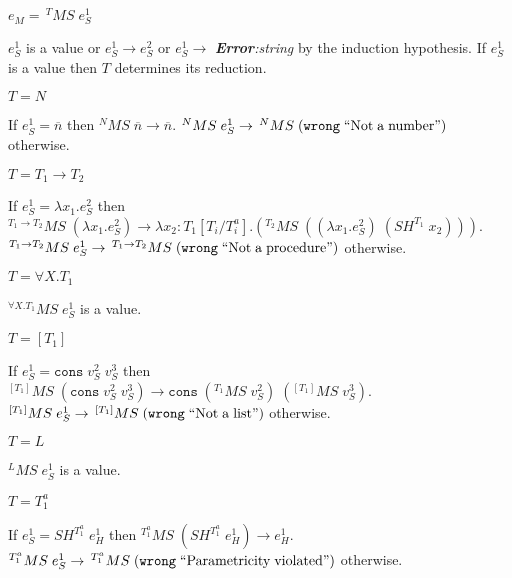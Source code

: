 \begin{case}
$e_{M}=\,^{T}MS\;e_{S}^{1}$

$e_{S}^{1}$ is a value or $e_{S}^{1}\rightarrow e_{S}^{2}$ or $e_{S}^{1}\rightarrow$ \emph{\textbf{Error}:\;string} by the induction hypothesis.  If $e_{S}^{1}$ is a value then $T$ determines its reduction.
\begin{subcase}
$T=N$

If $e_{S}^{1}=\overline{n}$ then $^{N}MS\;\overline{n}\rightarrow\overline{n}$.  $^{N}MS\;e_{S}^{1}\rightarrow\,^{N}MS\;(\mathtt{wrong}\;\mathrm{``Not\;a\;number"})$ otherwise.
\end{subcase}
\begin{subcase}
$T=T_{1}\rightarrow T_{2}$

If $e_{S}^{1}=\lambda x_{1}.e_{S}^{2}$ then $^{T_{1}\rightarrow T_{2}}MS\;(\lambda x_{1}.e_{S}^{2})\rightarrow\lambda x_{2}:T_{1}[T_{i}/T^{a}_{i}].(^{T_{2}}MS\;((\lambda x_{1}.e_{S}^{2})\;(SH^{T_{1}}\;x_{2})))$.  $^{T_{1}\rightarrow T_{2}}MS\;e_{S}^{1}\rightarrow\,^{T_{1}\rightarrow T_{2}}MS\;(\mathtt{wrong}\;\mathrm{``Not\;a\;procedure"})$ otherwise.
\end{subcase}
\begin{subcase}
$T=\forall X.T_{1}$

$^{\forall X.T_{1}}MS\;e_{S}^{1}$ is a value.
\end{subcase}
\begin{subcase}
$T=[T_{1}]$

If $e_{S}^{1}=\mathtt{cons}\;v_{S}^{2}\;v_{S}^{3}$ then $^{[T_{1}]}MS\;(\mathtt{cons}\;v_{S}^{2}\;v_{S}^{3})\rightarrow\mathtt{cons}\;(^{T_{1}}MS\;v_{S}^{2})\;(^{[T_{1}]}MS\;v_{S}^{3})$.  $^{[T_{1}]}MS\;e_{S}^{1}\rightarrow\,^{[T_{1}]}MS\;(\mathtt{wrong}\;\mathrm{``Not\;a\;list"})$ otherwise.
\end{subcase}
\begin{subcase}
$T=L$

$^{L}MS\;e_{S}^{1}$ is a value.
\end{subcase}
\begin{subcase}
$T=T_{1}^{a}$

If $e_{S}^{1}=SH^{T_{1}^{a}}\;e_{H}^{1}$ then $^{T_{1}^{a}}MS\;(SH^{T_{1}^{a}}\;e_{H}^{1})\rightarrow e_{H}^{1}$.  $^{T_{1}^{a}}MS\;e_{S}^{1}\rightarrow\,^{T_{1}^{a}}MS\;(\mathtt{wrong}\;\mathrm{``Parametricity\;violated"})$ otherwise.
\end{subcase}
\end{case}